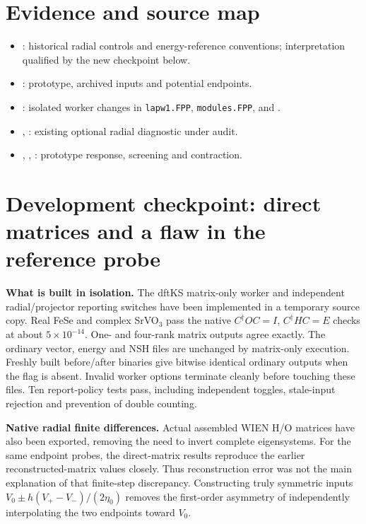 \documentclass[11pt]{article}
\begin{document}
\section*{Evidence and source map}
\begin{itemize}
\item {}: historical radial controls and energy-reference conventions; interpretation qualified by the new checkpoint below.
\item {}: prototype, archived inputs and potential endpoints.
\item {}: isolated worker changes in \texttt{lapw1.FPP}, \texttt{modules.FPP},  and .
\item {}, : existing optional radial diagnostic under audit.
\item {}, , : prototype response, screening and contraction.
\end{itemize}

\clearpage
\section*{Development checkpoint: direct matrices and a flaw in the reference probe}
\textbf{What is built in isolation.} The dftKS matrix-only worker and independent radial/projector reporting switches have been implemented in a temporary source copy. Real FeSe and complex SrVO$_3$ pass the native $C^\dagger OC=I$, $C^\dagger HC=E$ checks at about $5\times10^{-14}$. One- and four-rank matrix outputs agree exactly. The ordinary vector, energy and NSH files are unchanged by matrix-only execution. Freshly built before/after binaries give bitwise identical ordinary outputs when the flag is absent. Invalid worker options terminate cleanly before touching these files. Ten report-policy tests pass, including independent toggles, stale-input rejection and prevention of double counting.

\textbf{Native radial finite differences.} Actual assembled WIEN H/O matrices have also been exported, removing the need to invert complete eigensystems. For the same endpoint probes, the direct-matrix results reproduce the earlier reconstructed-matrix values closely. Thus reconstruction error was not the main explanation of that finite-step discrepancy. Constructing truly symmetric inputs $V_0\pm h(V_+-V_-)/(2\eta_0)$ removes the first-order asymmetry of independently interpolating the two endpoints toward $V_0$.
\end{document}
